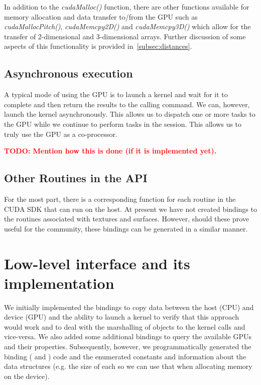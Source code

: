 \documentclass[article]{jss}
\newcommand{\note}[1]{\textbf{\textcolor{red}{#1}}}
\def\C{\proglang{C}}
\def\R{\proglang{R}}
\def\Rfunc#1{\textsl{#1()}}
\begin{document}
In addition to the \Rfunc{cudaMalloc} function, there
are other functions available for memory allocation and data transfer to/from
the GPU such as \Rfunc{cudaMallocPitch}, \Rfunc{cudaMemcpy2D} 
and \Rfunc{cudaMemcpy3D} which allow for the transfer of 
2-dimensional and 3-dimensional arrays. Further discussion
of some aspects of this functionality is provided in~\ref{subsec:distances}.

\subsection{Asynchronous execution}
A typical mode of using the GPU is to launch a kernel and wait for it
to complete and then return the results to the \R{} calling command.
We can, however, launch the kernel asynchronously.  This allows us to
dispatch one or more tasks to the GPU while we continue to perform
tasks in the \R{} session.  This allows us to truly use the GPU as a
co-processor.

\note{TODO: Mention how this is done (if it is implemented yet).}

\subsection{Other Routines in the API}

For the most part, there is a corresponding \R{} function for 
each routine in the CUDA SDK that can run on the host. At present 
we have not created bindings to the routines associated with textures
and surfaces. However, should these prove useful for the community, 
these bindings can be generated in a similar manner.







\section{Low-level interface and its implementation}
We initially implemented the bindings to copy data between the host
(CPU) and device (GPU) and the ability to launch a kernel to verify
that this approach would work and to deal with the marshalling of \R{}
objects to the kernel calls and vice-versa.  We also added some
additional bindings to query the available GPUs and their properties.
Subsequently, however, we programmatically generated the binding (\R{}
and \C) code and the enumerated constants and information about the
data structures (e.g. the size of each so we can use that when
allocating memory on the device).  
\end{document}
